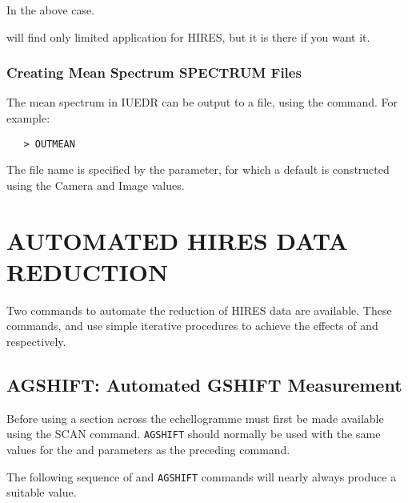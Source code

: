 In the above case.

 will find only limited application for HIRES, but it is there
if you want it.

\subsubsection{Creating Mean Spectrum SPECTRUM Files}

The mean spectrum in IUEDR can be output to a file, using the
command.  For example:

\begin{verbatim}
   > OUTMEAN
\end{verbatim}

The file name is specified by the 
parameter, for which a default is constructed using the Camera and Image
values.


\section{\label{se:auto_hires}AUTOMATED HIRES DATA
         REDUCTION}

Two commands to automate the reduction of HIRES data are available.  These
commands,  and
 use simple iterative procedures to
achieve the effects of  and
 respectively.

\subsection{AGSHIFT: Automated GSHIFT Measurement}

Before using 
 a section across the echellogramme must first be
made available using the SCAN command.  \verb+AGSHIFT+ should normally be
used with the same values for the 
 and  parameters as the  preceding
 command.

The following sequence of  and \verb+AGSHIFT+
commands will nearly  always produce a suitable
 value.

